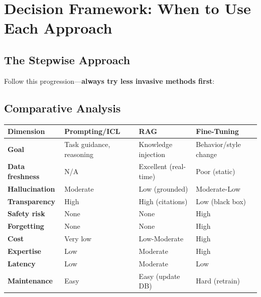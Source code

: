 \documentclass{article}
\begin{document}
\section{Decision Framework: When to Use Each Approach}

\subsection{The Stepwise Approach}

Follow this progression---\textbf{always try less invasive methods first}:

\begin{center}
\end{center}

\subsection{Comparative Analysis}

\begin{center}
\small
\begin{tabular}{p{2.5cm}p{3.5cm}p{3.5cm}p{3.5cm}}
\toprule
\textbf{Dimension} & \textbf{Prompting/ICL} & \textbf{RAG} & \textbf{Fine-Tuning} \\
\midrule
\textbf{Goal} & Task guidance, reasoning & Knowledge injection & Behavior/style change \\
\midrule
\textbf{Data freshness} & N/A & Excellent (real-time) & Poor (static) \\
\midrule
\textbf{Hallucination} & Moderate & Low (grounded) & Moderate-Low \\
\midrule
\textbf{Transparency} & High & High (citations) & Low (black box) \\
\midrule
\textbf{Safety risk} & None & None & High \\
\midrule
\textbf{Forgetting} & None & None & High \\
\midrule
\textbf{Cost} & Very low & Low-Moderate & High \\
\midrule
\textbf{Expertise} & Low & Moderate & High \\
\midrule
\textbf{Latency} & Low & Moderate & Low \\
\midrule
\textbf{Maintenance} & Easy & Easy (update DB) & Hard (retrain) \\
\bottomrule
\end{tabular}
\end{center}
\end{document}
